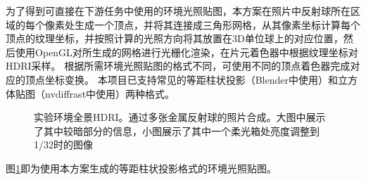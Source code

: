 \documentclass{ctexart}
\begin{document}
为了得到可直接在下游任务中使用的环境光照贴图，本方案在照片中反射球所在区域的每个像素处生成一个顶点，并将其连接成三角形网格，从其像素坐标计算每个顶点的纹理坐标，并按照计算的光照方向将其放置在3D单位球上的对应位置，然后使用OpenGL对所生成的网格进行光栅化渲染，在片元着色器中根据纹理坐标对HDRI采样。
根据所需环境光照贴图的格式不同，可使用不同的顶点着色器完成对应的顶点坐标变换。
本项目已支持常见的等距柱状投影（Blender中使用）和立方体贴图（nvdiffrast中使用）两种格式。
\begin{figure}
    \caption[实验环境全景HDRI]{实验环境全景HDRI。通过多张金属反射球的照片合成。大图中展示了其中较暗部分的信息，小图展示了其中一个柔光箱处亮度调整到1/32时的图像}
    \label{fig:HDRI}
\end{figure}
图\ref{fig:HDRI}即为使用本方案生成的等距柱状投影格式的环境光照贴图。
\end{document}
